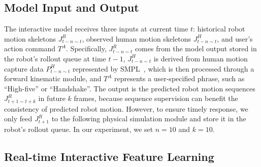 \subsection{Model Input and Output}
The interactive model receives three inputs at current time $t$: historical robot motion skeletons $J^R_{t-n \sim t}$, observed human motion skeletons $J^H_{t-n \sim t}$, and user's action command $T^A$.
Specifically, $J^R_{t-n \sim t}$ comes from the model output stored in the robot's rollout queue at time \( t-1 \), $J^H_{t-n \sim t}$ is derived from human motion capture data $P^H_{t-n \sim t}$ represented by SMPL~\cite{SMPL}, which is then processed through a forward kinematic module, and \( T^A \) represents a user-specified phrase, such as ``High-five'' or ``Handshake''.
The output is the predicted robot motion sequences $J^R_{t+1 \sim t+k}$ in future $k$ frames, because sequence supervision can benefit the consistency of predicted robot motion. However, to ensure timely response, we only feed $J^R_{t+1}$ to the following physical simulation module and store it in the robot's rollout queue. In our experiment, we set $n=10$ and $k=10$.

\subsection{Real-time Interactive Feature Learning}





